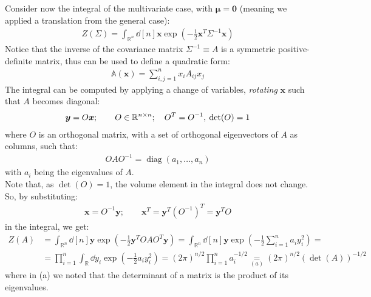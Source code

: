 \documentclass[../template.tex]{subfiles}
\begin{document}
Consider now the integral of the multivariate case, with $\bm{\mu} = \bm{0}$ (meaning we applied a translation from the general case): 
\begin{align*}
    Z(\Sigma) = \int_{\mathbb{R}^n} \dd[n]{\bm{x}}\exp\left(-\frac{1}{2}\bm{x}^T \Sigma^{-1} \bm{x} \right)
\end{align*}
Notice that the inverse of the covariance matrix $\Sigma^{-1} \equiv A$ is a symmetric positive-definite matrix, thus can be used to define a quadratic form:
\begin{align*}
    \mathbb{A}(\bm{x}) = \sum_{i,j=1}^n x_i A_{ij} x_j
\end{align*} 
The integral can be computed by applying a change of variables, \textit{rotating} $\bm{x}$ such that $A$ becomes diagonal:
\begin{align*}
    \bm{y} = O \bm{x}; \qquad O \in \mathbb{R}^{n\times n}; \quad O^T = O^{-1}, \> \operatorname{det}(O) = 1 
\end{align*}   
where $O$ is an orthogonal matrix, with a set of orthogonal eigenvectors of $A$ as columns, such that:
\begin{align*}
    O A O^{-1} = \operatorname{diag}(a_1, \dots, a_n) 
\end{align*}  
with $a_i$ being the eigenvalues of $A$.\\
Note that, as $\operatorname{det}(O) = 1$, the volume element in the integral does not change. So, by substituting:
\begin{align*}
    \bm{x} = O^{-1} \bm{y}; \qquad \bm{x}^T = \bm{y}^T (O^{-1})^T = \bm{y}^T O
\end{align*}
in the integral, we get:
\begin{align}\nonumber
    Z(A) &= \int_{\mathbb{R}^n} \dd[n]{\bm{y}} \exp\left(-\frac{1}{2} \bm{y}^T O A O^T \bm{y} \right) = \int_{\mathbb{R}^n} \dd[n]{\bm{y}} \exp\left(-\frac{1}{2} \sum_{i=1}^n a_i y_i^2 \right) =\\
    &= \prod_{i=1}^n \int_{\mathbb{R}} \dd{y_i} \exp\left(-\frac{1}{2} a_i y_i^2 \right) = (2\pi)^{n/2} \prod_{i=1}^n a_i^{-1/2} \underset{(a)}{=}  (2\pi)^{n/2} (\operatorname{det}(A))^{-1/2}
    \label{eqn:ZA}
\end{align} 
where in (a) we noted that the determinant of a matrix is the product of its eigenvalues.\\
\end{document}
